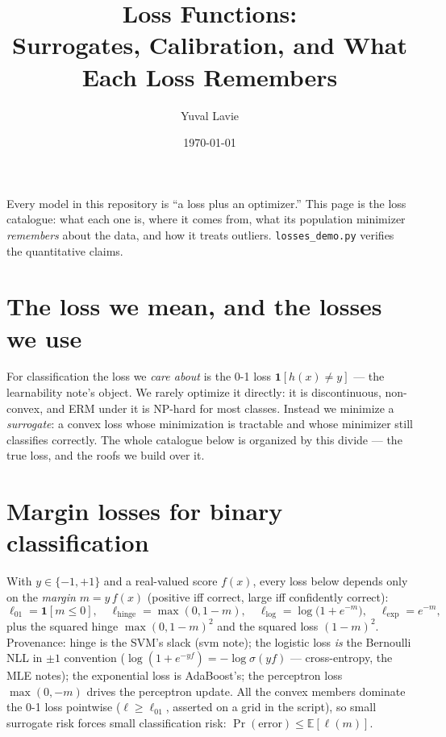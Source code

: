 \documentclass[11pt]{article}
\title{Loss Functions:\\
Surrogates, Calibration, and What Each Loss Remembers}
\author{Yuval Lavie}
\date{\today}
\begin{document}
\maketitle

\noindent
Every model in this repository is ``a loss plus an optimizer.'' This page
is the loss catalogue: what each one is, where it comes from, what its
population minimizer \emph{remembers} about the data, and how it treats
outliers. \texttt{losses\_demo.py} verifies the quantitative claims.

\section{The loss we mean, and the losses we use}

For classification the loss we \emph{care about} is the 0-1 loss
$\mathbf{1}[h(x) \ne y]$ --- the learnability note's object. We rarely
optimize it directly: it is discontinuous, non-convex, and ERM under it
is NP-hard for most classes. Instead we minimize a \emph{surrogate}: a
convex loss whose minimization is tractable and whose minimizer still
classifies correctly. The whole catalogue below is organized by this
divide --- the true loss, and the roofs we build over it.

\section{Margin losses for binary classification}

With $y \in \{-1,+1\}$ and a real-valued score $f(x)$, every loss below
depends only on the \emph{margin} $m = y\,f(x)$ (positive iff correct,
large iff confidently correct):
\begin{equation}
  \ell_{01} = \mathbf{1}[m \le 0], \quad
  \ell_{\mathrm{hinge}} = \max(0, 1-m), \quad
  \ell_{\mathrm{log}} = \log\bigl(1 + e^{-m}\bigr), \quad
  \ell_{\exp} = e^{-m},
  \label{eq:marginlosses}
\end{equation}
plus the squared hinge $\max(0,1-m)^2$ and the squared loss $(1-m)^2$.
Provenance: hinge is the SVM's slack (svm note); the logistic loss
\emph{is} the Bernoulli NLL in $\pm1$ convention ($\log(1+e^{-yf})
= -\log\sigma(yf)$ --- cross-entropy, the MLE notes); the exponential
loss is AdaBoost's; the perceptron loss $\max(0,-m)$ drives the
perceptron update. All the convex members dominate the 0-1 loss
pointwise ($\ell \ge \ell_{01}$, asserted on a grid in the script), so
small surrogate risk forces small classification risk:
$\Pr(\mathrm{error}) \le \mathbb{E}[\ell(m)]$.
\end{document}
